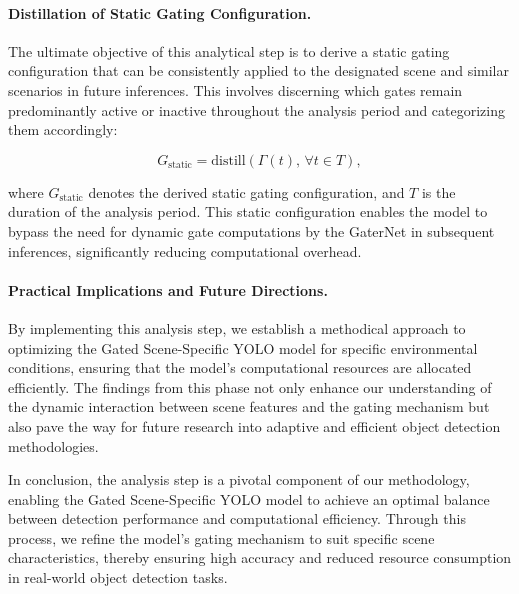 \paragraph{Distillation of Static Gating Configuration.} The ultimate objective of this analytical step is to derive a static gating configuration that can be consistently applied to the designated scene and similar scenarios in future inferences. This involves discerning which gates remain predominantly active or inactive throughout the analysis period and categorizing them accordingly:

\begin{equation}
G_{\text{static}} = \text{distill}(\Gamma(t), \, \forall t \in T),
\label{eq:static_gating_configuration}
\end{equation}

where \(G_{\text{static}}\) denotes the derived static gating configuration, and \(T\) is the duration of the analysis period. This static configuration enables the model to bypass the need for dynamic gate computations by the GaterNet in subsequent inferences, significantly reducing computational overhead.

\paragraph{Practical Implications and Future Directions.} By implementing this analysis step, we establish a methodical approach to optimizing the Gated Scene-Specific YOLO model for specific environmental conditions, ensuring that the model's computational resources are allocated efficiently. The findings from this phase not only enhance our understanding of the dynamic interaction between scene features and the gating mechanism but also pave the way for future research into adaptive and efficient object detection methodologies.

In conclusion, the analysis step is a pivotal component of our methodology, enabling the Gated Scene-Specific YOLO model to achieve an optimal balance between detection performance and computational efficiency. Through this process, we refine the model's gating mechanism to suit specific scene characteristics, thereby ensuring high accuracy and reduced resource consumption in real-world object detection tasks.

\clearpage
